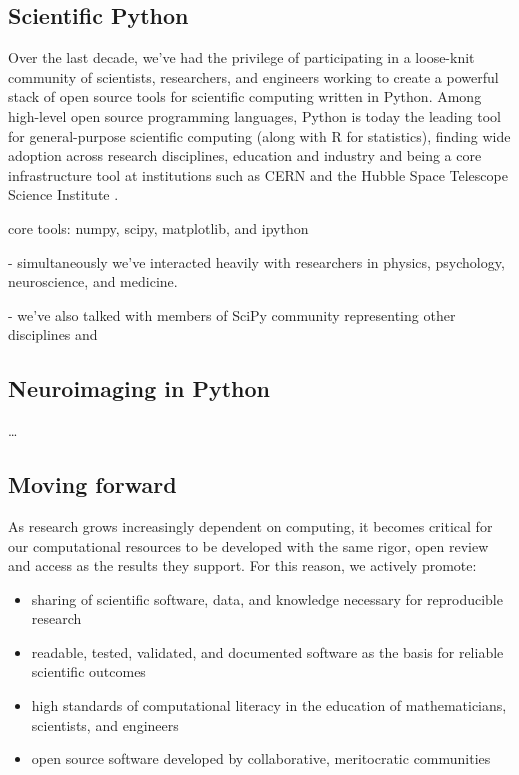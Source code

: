 \documentclass[ChapterTOCs,krantz2]{krantz} %
\theoremstyle{definition}
\begin{document}
\subsection{Scientific Python}

Over the last decade, we've had the privilege of participating in a loose-knit
community of scientists, researchers, and engineers working to create a powerful
stack of open source tools for scientific computing written in Python.  Among
high-level open source programming languages, Python is today the leading tool
for general-purpose scientific computing (along with R for statistics),
finding wide adoption across research disciplines, education and industry and
being a core infrastructure tool at institutions such as CERN and the Hubble
Space Telescope Science Institute
\cite{millman2011python,Perez2011,ganga09,SST}.


core tools: numpy, scipy, matplotlib, and ipython

- simultaneously we've interacted heavily with researchers in
physics, psychology, neuroscience, and medicine.

- we've also talked with members of SciPy community representing
other disciplines and 

\subsection{Neuroimaging in Python}

\ldots

\subsection{Moving forward}

As research grows increasingly dependent on computing, it becomes critical
for our computational resources to be developed with the same rigor, open review
and access as the results they support.  For this reason, we actively promote:

\begin{itemize}

\item sharing of scientific software, data, and knowledge necessary for
reproducible research

\item readable, tested, validated, and documented software as the basis for
reliable scientific outcomes

\item high standards of computational literacy in the education of
mathematicians, scientists, and engineers

\item open source software developed by collaborative, meritocratic
communities

\end{itemize}
\end{document}
